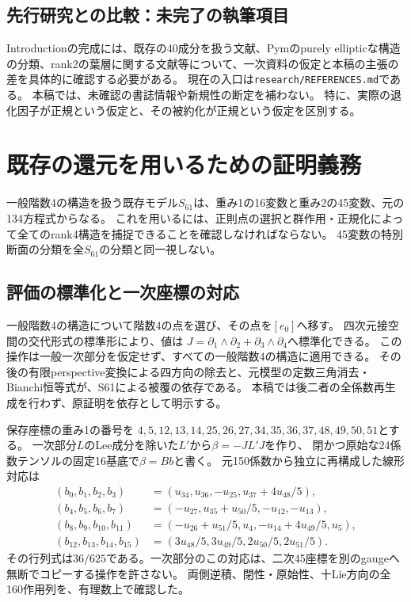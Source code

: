 \documentclass[a4paper,11pt]{ltjsarticle}
\theoremstyle{definition}
\begin{document}
\subsection{先行研究との比較：未完了の執筆項目}
Introductionの完成には、既存の40成分を扱う文献、Pymのpurely ellipticな構造の分類、rank2の葉層に関する文献等について、一次資料の仮定と本稿の主張の差を具体的に確認する必要がある。
現在の入口は\texttt{research/REFERENCES.md}である。
本稿では、未確認の書誌情報や新規性の断定を補わない。
特に、実際の退化因子が正規という仮定と、その被約化が正規という仮定を区別する。

\section{既存の還元を用いるための証明義務}
一般階数4の構造を扱う既存モデル\(S_{61}\)は、重み1の16変数と重み2の45変数、元の134方程式からなる。
これを用いるには、正則点の選択と群作用・正規化によって全てのrank4構造を捕捉できることを確認しなければならない。
45変数の特別断面の分類を全\(S_{61}\)の分類と同一視しない。

\subsection{評価の標準化と一次座標の対応}
一般階数4の構造について階数4の点を選び、その点を\([e_0]\)へ移す。
四次元接空間の交代形式の標準形により、値は
\(J=\partial_1\wedge\partial_2+\partial_3\wedge\partial_4\)へ標準化できる。
この操作は一般一次部分を仮定せず、すべての一般階数4の構造に適用できる。
その後の有限perspective変換による四方向の除去と、元模型の定数三角消去・Bianchi恒等式が、S61による被覆の依存である。
本稿では後二者の全係数再生成を行わず、原証明を依存として明示する。

保存座標の重み1の番号を
\(4,5,12,13,14,25,26,27,34,35,36,37,48,49,50,51\)とする。
一次部分\(L\)のLee成分を除いた\(L'\)から\(\beta=-JL'J\)を作り、
閉かつ原始な24係数テンソルの固定16基底で\(\beta=Bb\)と書く。
元150係数から独立に再構成した線形対応は
\[
\begin{aligned}
(b_0,b_1,b_2,b_3)&=(u_{34},u_{36},-u_{25},u_{37}+4u_{48}/5),\\
(b_4,b_5,b_6,b_7)&=(-u_{27},u_{35}+u_{50}/5,-u_{12},-u_{13}),\\
(b_8,b_9,b_{10},b_{11})&=(-u_{26}+u_{51}/5,u_4,-u_{14}+4u_{49}/5,u_5),\\
(b_{12},b_{13},b_{14},b_{15})&=(3u_{48}/5,3u_{49}/5,2u_{50}/5,2u_{51}/5).
\end{aligned}
\]
その行列式は\(36/625\)である。一次部分のこの対応は、二次45座標を別のgaugeへ無断でコピーする操作を許さない。
両側逆積、閉性・原始性、十Lie方向の全160作用列を、有理数上で確認した。
\end{document}
